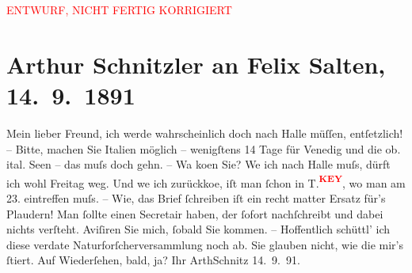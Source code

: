 
\begin{center}
            \textcolor{red}{ENTWURF, NICHT FERTIG KORRIGIERT}
                      \end{center}
            
         
         \renewcommand{\erwaehntePersonen}{Personen: Felix Salten}
         \renewcommand{\erwaehnteOrte}{Orte: Italien, Miskolc, Oberitalienische Seen, Venedig, Wien}
         \renewcommand{\erwaehnteWerke}{}
               \section[Arthur Schnitzler an Felix Salten, 14. 9. 1891]{ Arthur Schnitzler an Felix Salten, 14. 9. 1891}\nopagebreak{}\rehead{ }\begin{ledgroupsized}[t]{13cm}\normalsize\beginnumbering \toendnotes[C]{\smallbreak\pagebreak[2]} 
\pstart
           \noindent{}{\pb}Mein lieber Freund, ich werde wahrscheinlich doch nach Halle müſſen, entſetzlich! – Bitte, machen Sie
                  Italien möglich – wenigſtens 14 Tage für Venedig und die ob. ital. Seen – das muſs doch gehn. – Wa{\geminationn} ko{\geminationm}en Sie? We{\geminationn} ich nach Halle muſs, dürft ich wohl Freitag
               weg. Und we{\geminationn} ich zurückko{\geminationm}e, iſt {\pb}man ſchon in T.\textcolor{red}{\textsuperscript{\textbf{KEY}}}, wo man am 23. eintreffen muſs. –
               Wie, das Brief ſchreiben iſt ein recht matter Ersatz für’s Plaudern! Man ſollte einen
               Secretair haben, der ſofort nachſchreibt und dabei nichts verſteht. Aviſiren Sie
               mich, ſobald Sie kommen. – Hoffentlich schüttl’ ich diese verda{\geminationm}te Naturforſcherversammlung noch ab. Sie glauben nicht,
               wie die mir’s ſtiert. {\pb}\pend
           \pstart
           Auf Wiederſehen, bald, ja? \pend
           \pstart Ihr \spacefill\mbox{ArthSchnitz}\pend{}\pstart
           \raggedleft{}14. 9. 91.\pend
           
         
         \endnumbering{}\end{ledgroupsized}\begin{anhang}\end{anhang}\newcommand{\dateiname}{L02952}\newcommand{\titel}{Arthur Schnitzler an Felix Salten, 14. 9. 1891}\newcommand{\editorInnen}{Martin Anton Müller und Laura Untner}
      